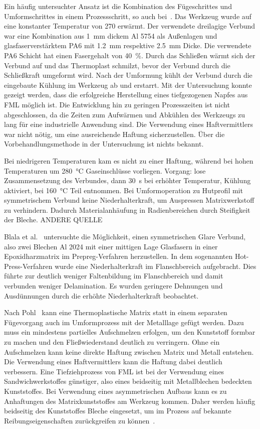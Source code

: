 Ein häufig untersuchter Ansatz ist die Kombination des Fügeschrittes und Umformschrittes in einem Prozessschritt, so auch bei~\cite{Behrens2014}.
Das Werkzeug wurde auf eine konstanter Temperatur von \SI{270}{\dC} erwärmt.
Der verwendete dreilagige Verbund war eine Kombination aus \SI{1}{\mm} dickem Al 5754 als Außenlagen und glasfaserverstärktem PA6 mit \SI{1.2}{\mm} respektive \SI{2.5}{\mm} Dicke.
Die verwendete PA6 Schicht hat einen Fasergehalt von \SI{40}{\percent}.
Durch das Schließen wärmt sich der Verbund auf und das Thermoplast schmilzt, bevor der Verbund durch die Schließkraft umgeformt wird.
Nach der Umformung kühlt der Verbund durch die eingebaute Kühlung im Werkzeug ab und erstarrt.
Mit der Untersuchung konnte gezeigt werden, dass die erfolgreiche Herstellung eines tiefgezogenen Napfes aus FML möglich ist.
Die Entwicklung hin zu geringen Prozesszeiten ist nicht abgeschlossen, da die Zeiten zum Aufwärmen und Abkühlen des Werkzeugs zu lang für eine industrielle Anwendung sind.
Die Verwendung eines Haftvermittlers war nicht nötig, um eine ausreichende Haftung sicherzustellen.
Über die Vorbehandlungsmethode in der Untersuchung ist nichts bekannt.~\cite{Behrens2014}



Bei niedrigeren Temperaturen kam es nicht zu einer Haftung, während bei hohen Temperaturen um \SI{280}{\degreeCelsius} Gaseinschlüsse vorliegen.
Vorgang: lose Zusammensetzung des Verbundes, dann \SI{30}{\second} bei erhöhter Temperatur, Kühlung aktiviert, bei \SI{160}{\degreeCelsius} Teil entnommen.
Bei Umformoperation zu Hutprofil mit symmetrischem Verbund keine Niederhalterkraft, um Auspressen Matrixwerkstoff zu verhindern.
Dadurch Materialanhäufung in Radienbereichen durch Steifigkeit der Bleche. ANDERE QUELLE

Blala et al.~\cite{Blala2021} untersuchte die Möglichkeit, einen symmetrischen Glare Verbund, also zwei Blechen Al 2024 mit einer mittigen Lage Glasfasern in einer Epoxidharzmatrix im Prepreg-Verfahren herzustellen.
In dem sogenannten Hot-Press-Verfahren wurde eine Niederhalterkraft im Flanschbereich aufgebracht.
Dies führte zur deutlich weniger Faltenbildung im Flanschbereich und damit verbunden weniger Delamination.
Es wurden geringere Dehnungen und Ausdünnungen durch die erhöhte Niederhalterkraft beobachtet.

Nach Pohl~\cite{Pohl2000} kann eine Thermoplastische Matrix statt in einem separaten Fügevorgang auch im Umformprozess mit der Metalllage gefügt werden.
Dazu muss ein mindestens partielles Aufschmelzen erfolgen, um den Kunststoff formbar zu machen und den Fließwiederstand deutlich zu verringern.
Ohne ein Aufschmelzen kann keine direkte Haftung zwischen Matrix und Metall entstehen.
Die Verwendung eines Haftvermittlers kann die Haftung dabei deutlich verbessern.
Eine Tiefziehprozess von FML ist bei der Verwendung eines Sandwichwerkstoffes günstiger, also eines beidseitig mit Metallblechen bedeckten Kunststoffes.
Bei Verwendung eines asymmetrischen Aufbaus kann es zu Anhaftungen des Matrixkunststoffes am Werkzeug kommen.
Daher werden häufig beidseitig des Kunststoffes Bleche eingesetzt, um im Prozess auf bekannte Reibungseigenschaften zurückgreifen zu können~\cite{Behrens2014}.



